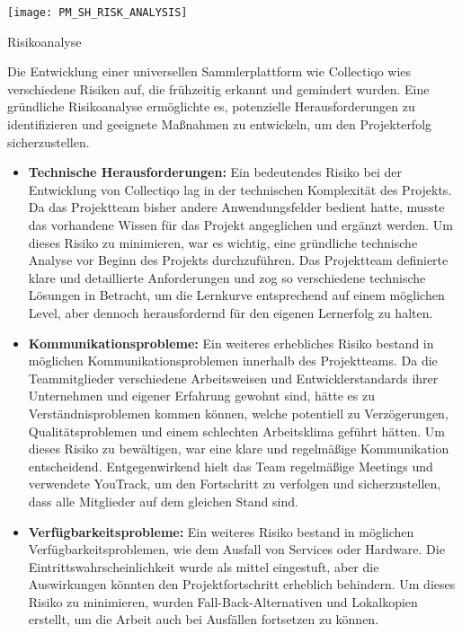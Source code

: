 
\begin{table}[h!]
    \centering
    \texttt{[image: PM\_SH\_RISK\_ANALYSIS]}
    \caption{Risikoanalyse}\label{tab:risikoanalyse}
\end{table}

Die Entwicklung einer universellen Sammlerplattform wie Collectiqo wies verschiedene Risiken auf, die frühzeitig erkannt und gemindert wurden.
Eine gründliche Risikoanalyse ermöglichte es, potenzielle Herausforderungen zu identifizieren und geeignete Maßnahmen zu entwickeln, um den Projekterfolg sicherzustellen.

\begin{itemize}[itemsep=1em, leftmargin=*]
    \item \textbf{Technische Herausforderungen:} Ein bedeutendes Risiko bei der Entwicklung von Collectiqo lag in der technischen Komplexität des Projekts.
    Da das Projektteam bisher andere Anwendungsfelder bedient hatte, musste das vorhandene Wissen für das Projekt angeglichen und ergänzt werden.
    Um dieses Risiko zu minimieren, war es wichtig, eine gründliche technische Analyse vor Beginn des Projekts durchzuführen.
    Das Projektteam definierte klare und detaillierte Anforderungen und zog so verschiedene technische Lösungen in Betracht, um die Lernkurve entsprechend auf einem möglichen Level, aber dennoch herausfordernd für den eigenen Lernerfolg zu halten.

    \item \textbf{Kommunikationsprobleme:} Ein weiteres erhebliches Risiko bestand in möglichen Kommunikationsproblemen innerhalb des Projektteams.
    Da die Teammitglieder verschiedene Arbeitsweisen und Entwicklerstandards ihrer Unternehmen und eigener Erfahrung gewohnt sind, hätte es zu Verständnisproblemen kommen können, welche potentiell zu Verzögerungen, Qualitätsproblemen und einem schlechten Arbeitsklima geführt hätten.
    Um dieses Risiko zu bewältigen, war eine klare und regelmäßige Kommunikation entscheidend.
    Entgegenwirkend hielt das Team regelmäßige Meetings und verwendete YouTrack, um den Fortschritt zu verfolgen und sicherzustellen, dass alle Mitglieder auf dem gleichen Stand sind.

    \item \textbf{Verfügbarkeitsprobleme:} Ein weiteres Risiko bestand in möglichen Verfügbarkeitsproblemen, wie dem Ausfall von Services oder Hardware.
    Die Eintrittswahrscheinlichkeit wurde als mittel eingestuft, aber die Auswirkungen könnten den Projektfortschritt erheblich behindern.
    Um dieses Risiko zu minimieren, wurden Fall-Back-Alternativen und Lokalkopien erstellt, um die Arbeit auch bei Ausfällen fortsetzen zu können.
\end{itemize}


